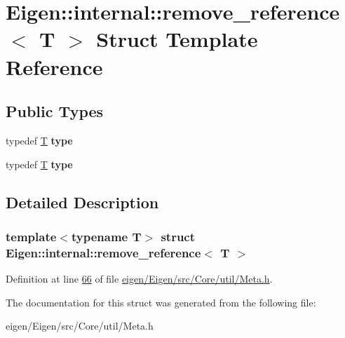 \hypertarget{struct_eigen_1_1internal_1_1remove__reference}{}\section{Eigen\+:\+:internal\+:\+:remove\+\_\+reference$<$ T $>$ Struct Template Reference}
\label{struct_eigen_1_1internal_1_1remove__reference}
\subsection*{Public Types}
\begin{DoxyCompactItemize}
\item 
\mbox{\label{struct_eigen_1_1internal_1_1remove__reference_a48fc595958f2006d8ddea90f18833ae0}} 
typedef \hyperlink{group___sparse_core___module}{T} {\bfseries type}
\item 
\mbox{\label{struct_eigen_1_1internal_1_1remove__reference_a48fc595958f2006d8ddea90f18833ae0}} 
typedef \hyperlink{group___sparse_core___module}{T} {\bfseries type}
\end{DoxyCompactItemize}


\subsection{Detailed Description}
\subsubsection*{template$<$typename T$>$\newline
struct Eigen\+::internal\+::remove\+\_\+reference$<$ T $>$}



Definition at line \hyperlink{eigen_2_eigen_2src_2_core_2util_2_meta_8h_source_l00066}{66} of file \hyperlink{eigen_2_eigen_2src_2_core_2util_2_meta_8h_source}{eigen/\+Eigen/src/\+Core/util/\+Meta.\+h}.



The documentation for this struct was generated from the following file\+:\begin{DoxyCompactItemize}
\item 
eigen/\+Eigen/src/\+Core/util/\+Meta.\+h\end{DoxyCompactItemize}
